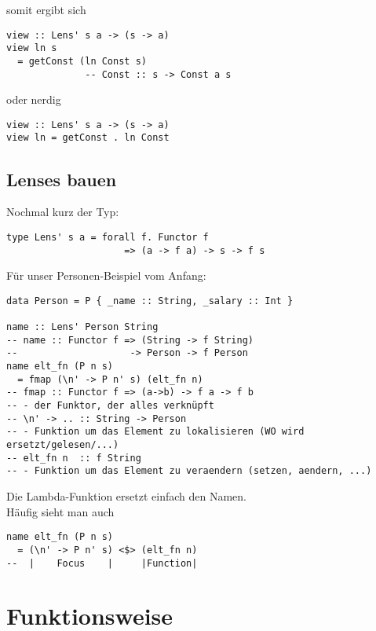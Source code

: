 \documentclass{beamer}
\begin{document}
\begin{frame}[fragile]
somit ergibt sich

\begin{verbatim}
view :: Lens' s a -> (s -> a)
view ln s 
  = getConst (ln Const s)
              -- Const :: s -> Const a s
\end{verbatim}
\pause
oder nerdig

\begin{verbatim}
view :: Lens' s a -> (s -> a)
view ln = getConst . ln Const
\end{verbatim}
\end{frame}

\subsection{Lenses bauen}
\begin{frame}[fragile]
Nochmal kurz der Typ:

\begin{verbatim}
type Lens' s a = forall f. Functor f
                     => (a -> f a) -> s -> f s
\end{verbatim}
\pause
Für unser Personen-Beispiel vom Anfang:
\small
\begin{verbatim}
data Person = P { _name :: String, _salary :: Int }

name :: Lens' Person String
-- name :: Functor f => (String -> f String)
--                    -> Person -> f Person
name elt_fn (P n s)
  = fmap (\n' -> P n' s) (elt_fn n)
-- fmap :: Functor f => (a->b) -> f a -> f b 
-- - der Funktor, der alles verknüpft
-- \n' -> .. :: String -> Person 
-- - Funktion um das Element zu lokalisieren (WO wird ersetzt/gelesen/...)
-- elt_fn n  :: f String         
-- - Funktion um das Element zu veraendern (setzen, aendern, ...)
\end{verbatim}
\normalsize
Die Lambda-Funktion ersetzt einfach den Namen.\\
\pause
Häufig sieht man auch

\begin{verbatim}
name elt_fn (P n s)
  = (\n' -> P n' s) <$> (elt_fn n)
--  |    Focus    |     |Function|
\end{verbatim}
\end{frame}

\section{Funktionsweise}
\end{document}
